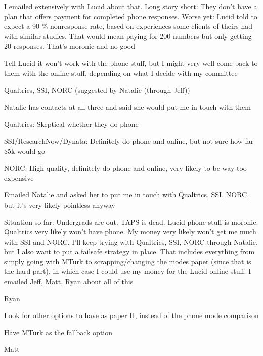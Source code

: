 \begin{coi}
\begin{coi}
				\item I emailed extensively with Lucid about that. Long story short: They don't have a plan that offers payment for completed phone responses. Worse yet: Lucid told to expect a 90 \% nonresponse rate, based on experiences some clients of theirs had with similar studies. That would mean paying for 200 numbers but only getting 20 responses. That's moronic and no good
				\item Tell Lucid it won't work with the phone stuff, but I might very well come back to them with the online stuff, depending on what I decide with my committee
			\end{coi}
		\item Qualtrics, SSI, NORC (suggested by Natalie (through Jeff))
			\begin{coi}
				\item Natalie has contacts at all three and said she would put me in touch with them
				\item Qualtrics: Skeptical whether they do phone
				\item SSI/ResearchNow/Dynata: Definitely do phone and online, but not sure how far \$5k would go
				\item NORC: High quality, definitely do phone and online, very likely to be way too expensive
				\item Emailed Natalie and asked her to put me in touch with Qualtrics, SSI, NORC, but it's very likely pointless anyway
			\end{coi}
		\item Situation so far: Undergrads are out. TAPS is dead. Lucid phone stuff is moronic. Qualtrics very likely won't have phone. My money very likely won't get me much with SSI and NORC. I'll keep trying with Qualtrics, SSI, NORC through Natalie, but I also want to put a failsafe strategy in place. That includes everything from simply going with MTurk to scrapping/changing the modes paper (since that is the hard part), in which case I could use my money for the Lucid online stuff. I emailed Jeff, Matt, Ryan about all of this
			\begin{coi}
				\item Ryan
					\begin{coi}
						\item Look for other options to have as paper II, instead of the phone mode comparison
						\item Have MTurk as the fallback option
					\end{coi}
				\item Matt

\end{coi}
\end{coi}
